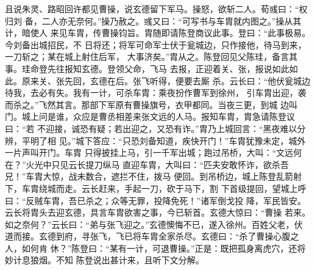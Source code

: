 且说朱灵、路昭回许都见曹操，说玄德留下军马。操怒，欲斩二人。荀彧曰：“权归刘
备，二人亦无奈何。”操乃赦之。彧又曰：“可写书与车胄就内图之。”操从其计，暗使人
来见车胄，传曹操钧旨。胄随即请陈登商议此事。登曰：“此事极易。今刘备出城招民，不
日将还；将军可命军士伏于瓮城边，只作接他，待马到来，一刀斩之；某在城上射住后军，
大事济矣。”胄从之。陈登回见父陈珪，备言其事。珪命登先往报知玄德。登领父命，飞马
去报，正迎着关、张，报说如此如此。原来关、张先回，玄德在后。张飞听得，便要去厮
杀。云长曰：“他伏瓮城边待我，去必有失。我有一计，可杀车胄：乘夜扮作曹军到徐州，
引车胄出迎，袭而杀之。”飞然其言。那部下军原有曹操旗号，衣甲都同。当夜三更，到城
边叫门。城上问是谁，众应是曹丞相差来张文远的人马。报知车胄，胄急请陈登议曰：“若
不迎接，诚恐有疑；若出迎之，又恐有诈。”胄乃上城回言：“黑夜难以分辨，平明了相
见。”城下答应：“只恐刘备知道，疾快开门！”车胄犹豫未定，城外一片声叫开门。车胄
只得披挂上马，引一千军出城；跑过吊桥，大叫：“文远何在？”火光中只见云长提刀纵马
直迎车胄，大叫曰：“匹夫安敢怀诈，欲杀吾兄！”车胄大惊，战未数合，遮拦不住，拨马
便回。到吊桥边，城上陈登乱箭射下，车胄绕城而走。云长赶来，手起一刀，砍于马下，割
下首级提回，望城上呼曰：“反贼车胄，吾已杀之；众等无罪，投降免死！”诸军倒戈投
降，军民皆安。云长将胄头去迎玄德，具言车胄欲害之事，今已斩首。玄德大惊曰：“曹操
若来。如之奈何？”云长曰：“弟与张飞迎之。”玄德懊悔不已，遂入徐州。百姓父老，伏
道而接。玄德到府，寻张飞，飞已将车胄全家杀尽。玄德曰：“杀了曹操心腹之人，如何肯
休？”陈登曰：“某有一计，可退曹操。”正是：既把孤身离虎穴，还将妙计息狼烟。不知
陈登说出甚计来，且听下文分解。